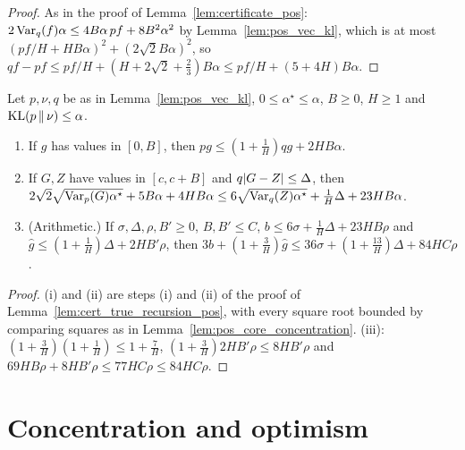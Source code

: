 \begin{proof}
\leanok
As in the proof of Lemma~\ref{lem:certificate_pos}: $2\operatorname{Var}_q(f)\alpha \le 4B\alpha\,pf + 8B^2\alpha^2$ by
Lemma~\ref{lem:pos_vec_kl}, which is at most $(pf/H + HB\alpha)^2 + (2\sqrt2B\alpha)^2$, so
$qf - pf \le pf/H + (H + 2\sqrt2 + \frac23)B\alpha \le pf/H + (5 + 4H)B\alpha$.
\end{proof}

\begin{lemma}\label{lem:pos_core_recursion}
\leanok
{}
Let $p, \nu, q$ be as in Lemma~\ref{lem:pos_vec_kl}, $0 \le \alpha^\star \le \alpha$, $B \ge 0$, $H \ge 1$ and
$\mathrm{KL}(p \,\|\, \nu) \le \alpha$.
\begin{enumerate}
  \item[(i)] If $g$ has values in $[0, B]$, then $pg \le (1 + \frac1H)qg + 2HB\alpha$.
  \item[(ii)] If $G, Z$ have values in $[c, c + B]$ and $q\lvert G - Z \rvert \le \Delta$, then
        $2\sqrt2\sqrt{\operatorname{Var}_p(G)\alpha^\star} + 5B\alpha + 4HB\alpha \le 6\sqrt{\operatorname{Var}_q(Z)\alpha^\star} + \frac1H\Delta + 23HB\alpha$.
  \item[(iii)] (Arithmetic.) If $\sigma, \Delta, \rho, B' \ge 0$, $B, B' \le C$, $b \le 6\sigma + \frac1H\Delta + 23HB\rho$
        and $\hat g \le (1 + \frac1H)\Delta + 2HB'\rho$, then
        $3b + (1 + \frac3H)\hat g \le 36\sigma + (1 + \frac{13}H)\Delta + 84HC\rho$.
\end{enumerate}
\end{lemma}

\begin{proof}
\leanok
(i) and (ii) are steps (i) and (ii) of the proof of Lemma~\ref{lem:cert_true_recursion_pos}, with every
square root bounded by comparing squares as in Lemma~\ref{lem:pos_core_concentration}. (iii): $(1 + \frac3H)(1 + \frac1H) \le 1 + \frac7H$,
$(1 + \frac3H)2HB'\rho \le 8HB'\rho$ and $69HB\rho + 8HB'\rho \le 77HC\rho \le 84HC\rho$.
\end{proof}

\section{Concentration and optimism}
\label{sec:pos_optimism}

